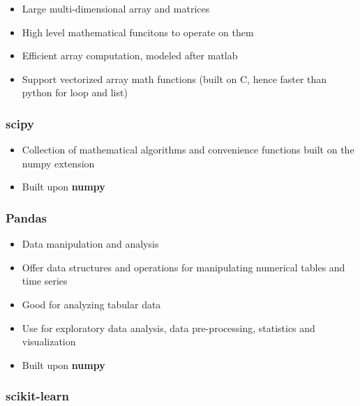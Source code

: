 \documentclass[
]{book}
\providecommand{\tightlist}{%
  \setlength{\itemsep}{0pt}\setlength{\parskip}{0pt}}
\begin{document}
\begin{itemize}
\tightlist
\item
  Large multi-dimensional array and matrices\\
\item
  High level mathematical funcitons to operate on them
\item
  Efficient array computation, modeled after matlab\\
\item
  Support vectorized array math functions (built on C, hence faster than python for loop and list)
\end{itemize}

\hypertarget{scipy}{%
\subsubsection{scipy}\label{scipy}}

\begin{itemize}
\tightlist
\item
  Collection of mathematical algorithms and convenience functions built on the numpy extension\\
\item
  Built upon \textbf{numpy}
\end{itemize}

\hypertarget{pandas}{%
\subsubsection{Pandas}\label{pandas}}

\begin{itemize}
\tightlist
\item
  Data manipulation and analysis
\item
  Offer data structures and operations for manipulating numerical tables and time series\\
\item
  Good for analyzing tabular data\\
\item
  Use for exploratory data analysis, data pre-processing, statistics and visualization
\item
  Built upon \textbf{numpy}
\end{itemize}

\hypertarget{scikit-learn}{%
\subsubsection{scikit-learn}\label{scikit-learn}}
\end{document}
